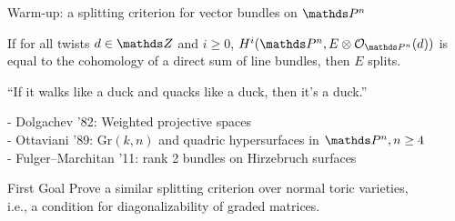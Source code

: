 \documentclass[beamer]{paper}
\newcommand{\Om}{\Omega}
\begin{document}



\begin{frame}{Warm-up: a splitting criterion for vector bundles on $\PPn$}
  \begin{theorem}[Horrocks '64]
    If for all twists $d\in\ZZ$ and $i\geq 0$, $\HH^i(\PPn, E\otimes\o_{\PPn}(d))$ is
    equal to the cohomology of a direct sum of line bundles, then $E$ splits.
  \end{theorem}

  \vfill
  \pause
  \begin{center}
    \color{rossred}``If it walks like a duck and quacks like a duck, then it's a duck.''
  \end{center}


  \vfill
  \pause
  - Dolgachev '82: Weighted projective spaces \\
  - Ottaviani '89: $\mathrm{Gr}(k,n)$ and quadric hypersurfaces in $\PPn, n\geq4$ \\
  - Fulger--Marchitan '11: rank 2 bundles on Hirzebruch surfaces \\

  \vfill
  \pause
  \begin{block}{First Goal}
    \centering
    Prove a similar splitting criterion over normal toric varieties, \pause \\
    i.e., a condition for diagonalizability of graded matrices.
  \end{block}
\end{frame}
\end{document}
